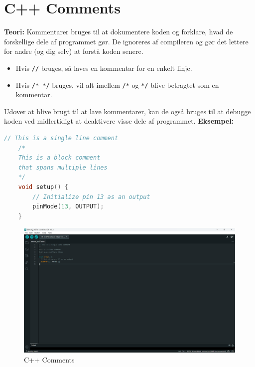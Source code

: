 \section{C++ Comments}
\textbf{Teori:} Kommentarer bruges til at dokumentere koden og forklare, hvad de forskellige dele af programmet gør. De ignoreres af compileren og gør det lettere for andre (og dig selv) at forstå koden senere.
\begin{itemize}
	\item Hvis \texttt{//} bruges, så laves en kommentar for en enkelt linje.
	\item Hvis \texttt{/* */} bruges, vil alt imellem \texttt{/*} og \texttt{*/} blive betragtet som en kommentar.
\end{itemize}
Udover at blive brugt til at lave kommentarer, kan de også bruges til at debugge koden ved midlertidigt at deaktivere visse dele af programmet.
\clearpage
\noindent\textbf{Eksempel:}
\begin{lstlisting}[language=C++]
	// This is a single line comment
	/*
	This is a block comment
	that spans multiple lines
	*/
	void setup() {
		// Initialize pin 13 as an output
		pinMode(13, OUTPUT);
	}
\end{lstlisting}
\begin{figure}[h!]
	\centering
	\includegraphics[width=\textwidth]{fig/fig2.png}
	\caption{C++ Comments}
	\label{fig:2}
\end{figure}

